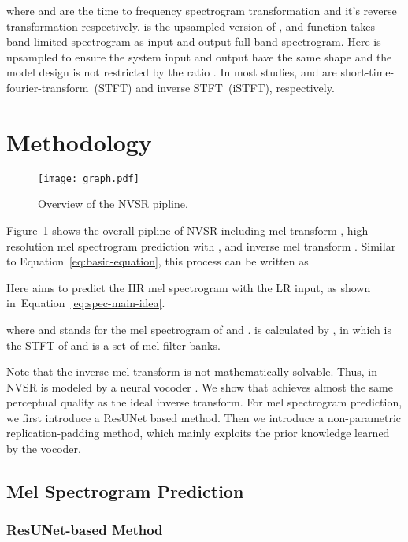 \documentclass[a4paper]{article}
\def\Figref#1{Figure~\ref{#1}}
\def\Eqref#1{Equation~\ref{#1}}
\begin{document}
where  and  are the time to frequency spectrogram transformation and it's reverse transformation respectively.  is the upsampled version of , and function  takes band-limited spectrogram as input and output full band spectrogram. Here  is upsampled to ensure the system input and output have the same shape and the model design is not restricted by the ratio . In most studies,  and  are short-time-fourier-transform~(STFT) and inverse STFT~(iSTFT), respectively.





\section{Methodology}
\label{sec:methodology}
\begin{figure}[htbp] \centering
  \texttt{[image: graph.pdf]}
  \caption{Overview of the NVSR pipline.}
  \label{fig-main}
\end{figure}

\Figref{fig-main} shows the overall pipline of NVSR including mel transform , high resolution mel spectrogram prediction with , and inverse mel transform . Similar to \Eqref{eq:basic-equation}, this process can be written as

Here  aims to predict the HR mel spectrogram with the LR input, as shown in~\Eqref{eq:spec-main-idea}. 

where  and  stands for the mel spectrogram of  and .  is calculated by , in which  is the STFT of  and  is a set of mel filter banks.

Note that the inverse mel transform is not mathematically solvable. Thus,  in NVSR is modeled by a neural vocoder . We show that  achieves almost the same perceptual quality as the ideal inverse transform. For mel spectrogram prediction, we first introduce a ResUNet based method. Then we introduce a non-parametric replication-padding method, which mainly exploits the prior knowledge learned by the vocoder. 

\subsection{Mel Spectrogram Prediction}
\label{sec:mel spectrogramtrogram-prediction}








\subsubsection{ResUNet-based Method}
\label{sec:nn-method}
\end{document}
